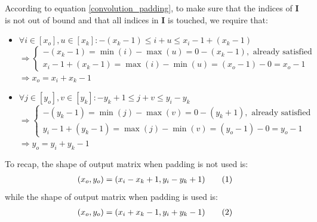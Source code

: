 \documentclass[12pt]{article}
\newcommand\numberthis{\stepcounter{equation}\tag{\theequation}}
\begin{document}
According to equation \eqref{convolution_padding}, to make sure that the indices of $\bm{I}$ is not out of bound and that all indices in $\bm{I}$ is touched, we require that:
\begin{itemize}
    \item $\forall i \in [x_o], u \in [x_k]: -(x_k - 1)\leq i + u \leq x_i - 1 + (x_k - 1)$\\
    \quad $\Rightarrow
    \begin{cases}
    -(x_k - 1) = \min{(i)} - \max{(u)} = 0 - (x_k - 1), \text{ already satisfied}\\
    x_i - 1 + (x_k - 1) = \max{(i)} - \min{(u)} = (x_o - 1) - 0 = x_o - 1
    \end{cases}
    $\\
    \quad $\Rightarrow x_o = x_i + x_k - 1$
    \item $\forall j \in [y_o], v \in [y_k]: -y_k + 1 \leq j + v \leq y_i - y_k$\\
    \quad $\Rightarrow
    \begin{cases}
    -(y_k - 1) = \min{(j)} - \max{(v)} = 0 - (y_k + 1), \text{ already satisfied}\\
    y_i -  1 + (y_k - 1) = \max{(j)} - \min{(v)} = (y_o - 1) - 0 = y_o - 1
    \end{cases}
    $\\
    \quad $\Rightarrow y_o = y_i + y_k - 1$
\end{itemize}
To recap, the shape of output matrix when padding is not used is:
\begin{align*}
    (x_o, y_o) =  (x_i - x_k + 1, y_i - y_k + 1)
    \numberthis \label{no_padding_shape}
\end{align*}
while the shape of output matrix when padding is used is:
\begin{align*}
    (x_o, y_o) = (x_i + x_k - 1, y_i + y_k - 1)
    \numberthis \label{padding_shape}
\end{align*}
\end{document}
